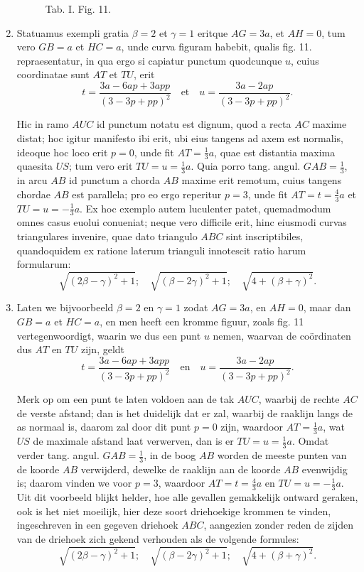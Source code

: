 \documentclass[10pt,a4paper]{article}
\newcommand{\switchenum}{\setcounter{enumi}{\arabic{enumi}-1}\switchcolumn}
\begin{document}
\begin{paracol}{2}
\begin{enumerate}[topsep=1px]
\begin{figure}[h]
{\begin{tikzpicture}[rotate=180, scale=1]
				\end{tikzpicture}}
			\selectfont
			\caption{Tab. I. Fig. 11.}
		\end{figure}
		
		\switchcolumn*
		
		\item Statuamus exempli gratia $\beta = 2$ et $\gamma = 1$ eritque $AG = 3a$, et $AH = 0$, tum vero $GB = a$ et $HC=a$, unde curva figuram habebit, qualis fig. 11. repraesentatur, in qua ergo si capiatur punctum quodcunque $u$, cuius coordinatae sunt $AT$ et $TU$, erit
		\[
			t = \frac{3a-6ap+3app}{(3-3p+pp)^2} \quad \text{et} \quad u = \frac{3a-2ap}{(3-3p+pp)^2}.
		\]
		\par Hic in ramo $AUC$ id punctum notatu est dignum, quod a recta $AC$ maxime distat; hoc igitur manifesto ibi erit, ubi eius tangens ad axem est normalis, ideoque hoc loco erit $p=0$, unde fit $AT=\frac{1}{3}a$, quae est distantia maxima quaesita $US$; tum vero erit $TU=u=\frac{1}{3}a$. Quia porro tang. angul. $GAB=\frac{1}{3}$, in arcu $AB$ id punctum a chorda $AB$ maxime erit remotum, cuius tangens chordae $AB$ est parallela; pro eo ergo reperitur $p=3$, unde fit $AT= t = \frac{4}{3}a$ et $TU=u=-\frac{1}{3}a$. Ex hoc exemplo autem luculenter patet, quemadmodum omnes casus euolui conueniat; neque vero difficile erit, hinc eiusmodi curvas triangulares invenire, quae dato triangulo $ABC$ sint inscriptibiles, quandoquidem ex ratione laterum trianguli innotescit ratio harum formularum:
		\[
			\sqrt{(2\beta-\gamma)^2+1}; \quad \sqrt{(\beta-2\gamma)^2+1}; \quad  \sqrt{4+(\beta+\gamma)^2}.
		\]
				
		\switchenum
		\item Laten we bijvoorbeeld $\beta = 2$ en $\gamma = 1$ zodat $AG=3a$, en $AH=0$, maar dan $GB = a$ et $HC=a$, en men heeft een kromme figuur, zoals fig. 11 vertegenwoordigt, waarin we dus een punt $u$ nemen, waarvan de coördinaten dus $AT$ en $TU$ zijn, geldt
		\[
			t = \frac{3a-6ap+3app}{(3-3p+pp)^2} \quad \text{en} \quad u = \frac{3a-2ap}{(3-3p+pp)^2}.
		\]
		\par Merk op om een punt te laten voldoen aan de tak $AUC$, waarbij de rechte $AC$ de verste afstand; dan is het duidelijk dat er zal, waarbij de raaklijn langs de as normaal is, daarom zal door dit punt $p=0$ zijn, waardoor $AT=\frac{1}{3}a$, wat $US$ de maximale afstand laat verwerven, dan is er $TU=u=\frac{1}{3}a$. Omdat verder tang. angul. $GAB=\frac{1}{3}$, in de boog $AB$ worden de meeste punten van de koorde $AB$ verwijderd, dewelke de raaklijn aan de koorde $AB$ evenwijdig is; daarom vinden we voor $p=3$, waardoor $AT= t = \frac{4}{3}a$ en $TU=u=-\frac{1}{3}a$. Uit dit voorbeeld blijkt helder, hoe alle gevallen gemakkelijk ontward geraken, ook is het niet moeilijk, hier deze soort driehoekige krommen te vinden, ingeschreven in een gegeven driehoek $ABC$, aangezien zonder reden de zijden van de driehoek zich gekend verhouden als de volgende formules:
		\[
			\sqrt{(2\beta-\gamma)^2+1}; \quad \sqrt{(\beta-2\gamma)^2+1}; \quad  \sqrt{4+(\beta+\gamma)^2}.
		\]
		

\end{enumerate}
\end{paracol}
\end{document}
